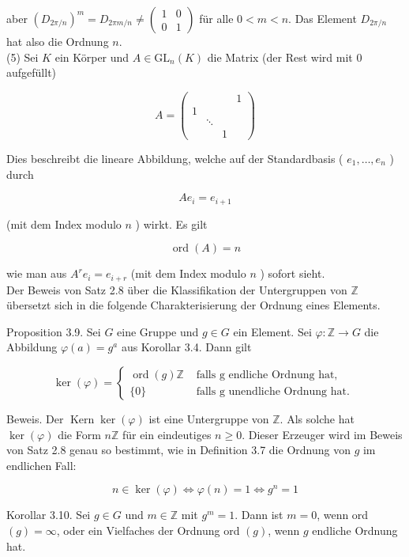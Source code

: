 \documentclass[10pt, letterpaper]{article}
\begin{document}
aber $\left(D_{2 \pi / n}\right)^{m}=D_{2 \pi m / n} \neq\left(\begin{array}{ll}1 & 0 \\ 0 & 1\end{array}\right)$ für alle $0<m<n$. Das Element $D_{2 \pi / n}$ hat also die Ordnung $n$.\\
(5) Sei $K$ ein Körper und $A \in \mathrm{GL}_{n}(K)$ die Matrix (der Rest wird mit 0 aufgefüllt)

$$
A=\left(\begin{array}{llll} 
& & & 1 \\
1 & & & \\
& \ddots & & \\
& & 1 &
\end{array}\right)
$$

Dies beschreibt die lineare Abbildung, welche auf der Standardbasis ( $e_{1}, \ldots, e_{n}$ ) durch

$$
A e_{i}=e_{i+1}
$$

(mit dem Index modulo $n$ ) wirkt. Es gilt

$$
\operatorname{ord}(A)=n
$$

wie man aus $A^{r} e_{i}=e_{i+r}$ (mit dem Index modulo $n$ ) sofort sieht.\\
Der Beweis von Satz 2.8 über die Klassifikation der Untergruppen von $\mathbb{Z}$ übersetzt sich in die folgende Charakterisierung der Ordnung eines Elements.

Proposition 3.9. Sei $G$ eine Gruppe und $g \in G$ ein Element. Sei $\varphi: \mathbb{Z} \rightarrow G$ die Abbildung $\varphi(a)=g^{a}$ aus Korollar 3.4. Dann gilt

$$
\operatorname{ker}(\varphi)= \begin{cases}\operatorname{ord}(g) \mathbb{Z} & \text { falls g endliche Ordnung hat, } \\ \{0\} & \text { falls g unendliche Ordnung hat. }\end{cases}
$$

Beweis. Der $\operatorname{Kern} \operatorname{ker}(\varphi)$ ist eine Untergruppe von $\mathbb{Z}$. Als solche hat $\operatorname{ker}(\varphi)$ die Form $n \mathbb{Z}$ für ein eindeutiges $n \geq 0$. Dieser Erzeuger wird im Beweis von Satz 2.8 genau so bestimmt, wie in Definition 3.7 die Ordnung von $g$ im endlichen Fall:

$$
n \in \operatorname{ker}(\varphi) \Longleftrightarrow \varphi(n)=1 \Longleftrightarrow g^{n}=1
$$

Korollar 3.10. Sei $g \in G$ und $m \in \mathbb{Z}$ mit $g^{m}=1$. Dann ist $m=0$, wenn ord $(g)=\infty$, oder ein Vielfaches der Ordnung ord $(g)$, wenn $g$ endliche Ordnung hat.
\end{document}
